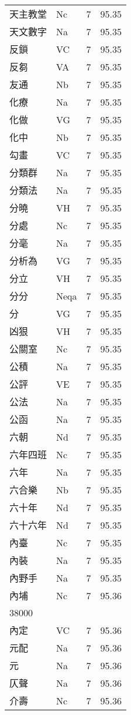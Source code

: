 \documentclass[twocolumn]{book}
\begin{document}
\begin{supertabular}{llrr}
天主教堂 & Nc & 7 &  95.35\\
天文數字 & Na & 7 &  95.35\\
反鎖 & VC & 7 &  95.35\\
反芻 & VA & 7 &  95.35\\
友通 & Nb & 7 &  95.35\\
化療 & Na & 7 &  95.35\\
化做 & VG & 7 &  95.35\\
化中 & Nb & 7 &  95.35\\
勾畫 & VC & 7 &  95.35\\
分類群 & Na & 7 &  95.35\\
分類法 & Na & 7 &  95.35\\
分曉 & VH & 7 &  95.35\\
分處 & Nc & 7 &  95.35\\
分毫 & Na & 7 &  95.35\\
分析為 & VG & 7 &  95.35\\
分立 & VH & 7 &  95.35\\
分分 & Neqa & 7 &  95.35\\
分 & VG & 7 &  95.35\\
凶狠 & VH & 7 &  95.35\\
公關室 & Nc & 7 &  95.35\\
公積 & Na & 7 &  95.35\\
公評 & VE & 7 &  95.35\\
公法 & Na & 7 &  95.35\\
公函 & Na & 7 &  95.35\\
六朝 & Nd & 7 &  95.35\\
六年四班 & Nc & 7 &  95.35\\
六年 & Na & 7 &  95.35\\
六合樂 & Nb & 7 &  95.35\\
六十年 & Nd & 7 &  95.35\\
六十六年 & Nd & 7 &  95.35\\
內臺 & Nc & 7 &  95.35\\
內裝 & Na & 7 &  95.35\\
內野手 & Na & 7 &  95.35\\
內埔 & Nc & 7 &  95.36\\
38000\\
內定 & VC & 7 &  95.36\\
元配 & Na & 7 &  95.36\\
元 & Na & 7 &  95.36\\
仄聲 & Na & 7 &  95.36\\
介壽 & Nc & 7 &  95.36\\

\end{supertabular}
\end{document}
